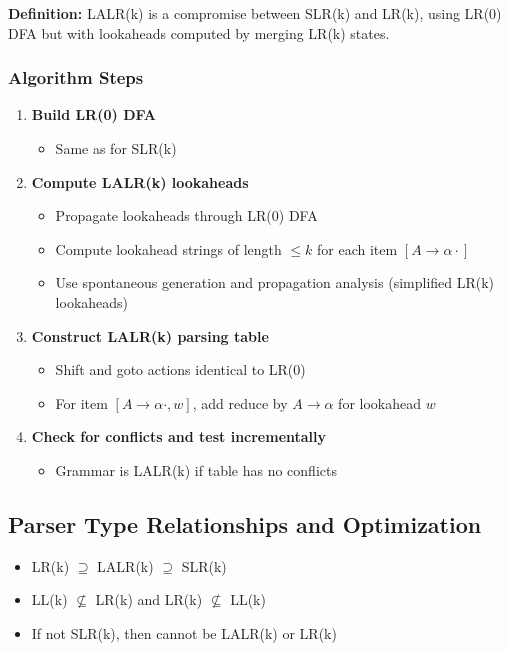 \textbf{Definition:} LALR(k) is a compromise between SLR(k) and LR(k), using LR(0) DFA but with lookaheads computed by merging LR(k) states.

\subsubsection{Algorithm Steps}

\begin{enumerate}
    \item \textbf{Build LR(0) DFA}
    \begin{itemize}
        \item Same as for SLR(k)
    \end{itemize}

    \item \textbf{Compute LALR(k) lookaheads}
    \begin{itemize}
        \item Propagate lookaheads through LR(0) DFA
        \item Compute lookahead strings of length $\leq k$ for each item $[A \to \alpha \cdot]$
        \item Use spontaneous generation and propagation analysis (simplified LR(k) lookaheads)
    \end{itemize}

    \item \textbf{Construct LALR(k) parsing table}
    \begin{itemize}
        \item Shift and goto actions identical to LR(0)
        \item For item $[A \to \alpha \cdot, w]$, add reduce by $A \to \alpha$ for lookahead $w$
    \end{itemize}

    \item \textbf{Check for conflicts and test incrementally}
    \begin{itemize}
        \item Grammar is LALR(k) if table has no conflicts
    \end{itemize}
\end{enumerate}


\subsection{Parser Type Relationships and Optimization}

\begin{itemize}
    \item LR(k) $\supseteq$ LALR(k) $\supseteq$ SLR(k)
    \item LL(k) $\not\subseteq$ LR(k) and LR(k) $\not\subseteq$ LL(k)
    \item If not SLR(k), then cannot be LALR(k) or LR(k)
\end{itemize}
